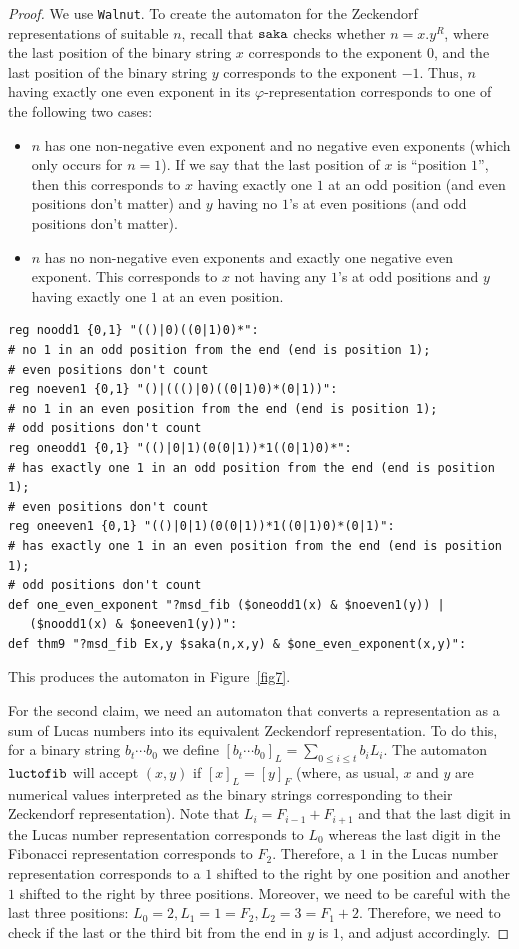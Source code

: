 \documentclass[12pt,reqno]{article}
\begin{document}
\begin{proof}
We use {\tt Walnut}. 
To create the automaton for the Zeckendorf representations of suitable $n$, recall that ${\tt saka}$ checks whether $n = x.y^R$, where the last position of the binary string $x$ corresponds to the exponent $0$, and the last position of the binary string $y$ corresponds to the exponent $-1$. 
Thus, $n$ having exactly one even exponent in its $\varphi$-representation corresponds to one of the following two cases:
\begin{itemize}
	\item $n$ has one non-negative even exponent and no negative even exponents (which only occurs for $n = 1$). If we say that the last position of $x$ is ``position $1$'', then this corresponds to $x$ having exactly one $1$ at an odd position (and even positions don't matter) and $y$ having no $1$'s at even positions (and odd positions don't matter).
	\item $n$ has no non-negative even exponents and exactly one negative even exponent. This corresponds to $x$ not having any $1$'s at odd positions and $y$ having exactly one $1$ at an even position.
\end{itemize}


\begin{verbatim}
reg noodd1 {0,1} "(()|0)((0|1)0)*":
# no 1 in an odd position from the end (end is position 1); 
# even positions don't count
reg noeven1 {0,1} "()|((()|0)((0|1)0)*(0|1))":
# no 1 in an even position from the end (end is position 1); 
# odd positions don't count
reg oneodd1 {0,1} "(()|0|1)(0(0|1))*1((0|1)0)*":
# has exactly one 1 in an odd position from the end (end is position 1); 
# even positions don't count
reg oneeven1 {0,1} "(()|0|1)(0(0|1))*1((0|1)0)*(0|1)":
# has exactly one 1 in an even position from the end (end is position 1); 
# odd positions don't count
def one_even_exponent "?msd_fib ($oneodd1(x) & $noeven1(y)) | 
   ($noodd1(x) & $oneeven1(y))":
def thm9 "?msd_fib Ex,y $saka(n,x,y) & $one_even_exponent(x,y)":
\end{verbatim}
This produces the automaton in
Figure~\ref{fig7}.  

For the second claim, we need an automaton that converts a representation as a sum of Lucas numbers into its equivalent Zeckendorf representation.  To do this, for a binary string
$b_t \cdots b_0$ we define
$[b_t \cdots b_0]_L = \sum_{0 \leq i \leq t} b_i L_i$.
The automaton ${\tt luctofib}$ will accept $(x,y)$ if $[x]_L = [y]_F$ (where, as usual, $x$ and $y$ are numerical values interpreted as the binary strings corresponding to their Zeckendorf representation). 
Note that $L_i = F_{i-1} + F_{i+1}$ and 
that the last digit in the Lucas number representation corresponds to $L_0$ whereas the last digit in the Fibonacci representation corresponds to $F_2$.
Therefore, a $1$ in the Lucas number representation corresponds to a $1$ shifted to the right by one position and another $1$ shifted to the right by three positions. 
Moreover, we need to be careful with the last three positions: $L_0 = 2, L_1 = 1 = F_2, L_2 = 3 = F_1 + 2$. 
Therefore, we need to check if the last or the third bit from the end in $y$ is $1$, and adjust accordingly.



\end{proof}
\end{document}
